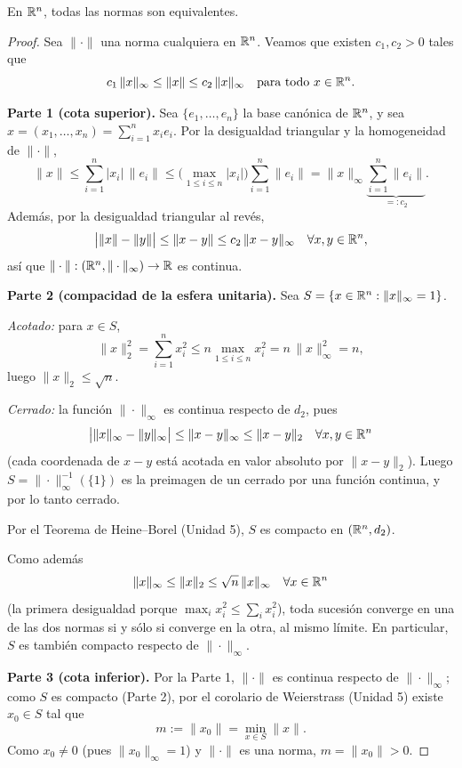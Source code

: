 \begin{teo}
En $\mathbb{R}^n$, todas las normas son equivalentes.
\end{teo}

\begin{proof}
Sea $\|\cdot\|$ una norma cualquiera en $\mathbb{R}^n$. Veamos que existen
$c_1,c_2>0$ tales que
\[
c_1\,\|x\|_\infty \le \|x\| \le c_2\,\|x\|_\infty \quad
\text{para todo } x\in\mathbb{R}^n.
\]

\textbf{Parte 1 (cota superior).} Sea $\{e_1,\dots,e_n\}$ la base
canónica de $\mathbb{R}^n$, y sea $x=(x_1,\dots,x_n)=\sum_{i=1}^n x_i e_i$. Por
la desigualdad triangular y la homogeneidad de $\|\cdot\|$,
\[
\|x\| \le \sum_{i=1}^n |x_i|\,\|e_i\| \le
\Big(\max_{1\le i\le n}|x_i|\Big)\sum_{i=1}^n \|e_i\|
= \|x\|_\infty \underbrace{\sum_{i=1}^n \|e_i\|}_{=:c_2} .
\]
Además, por la desigualdad triangular al revés,
\[
\bigl|\|x\|-\|y\|\bigr| \le \|x-y\| \le c_2\,\|x-y\|_\infty \quad
\forall x,y\in\mathbb{R}^n,
\]
así que $\|\cdot\| : (\mathbb{R}^n,\|\cdot\|_\infty)\to\mathbb{R}$ es continua.

\textbf{Parte 2 (compacidad de la esfera unitaria).} Sea
$S=\{x\in\mathbb{R}^n : \|x\|_\infty=1\}$.

\emph{Acotado:} para $x\in S$,
\[
\|x\|_2^2 = \sum_{i=1}^n x_i^2 \le n \max_{1\le i\le n} x_i^2
= n\,\|x\|_\infty^2 = n,
\]
luego $\|x\|_2 \le \sqrt n$.

\emph{Cerrado:} la función $\|\cdot\|_\infty$ es continua respecto de
$d_2$, pues
\[
\bigl|\|x\|_\infty-\|y\|_\infty\bigr| \le \|x-y\|_\infty \le \|x-y\|_2
\quad \forall x,y\in\mathbb{R}^n
\]
(cada coordenada de $x-y$ está acotada en valor absoluto por
$\|x-y\|_2$). Luego $S=\|\cdot\|_\infty^{-1}(\{1\})$ es la preimagen de
un cerrado por una función continua, y por lo tanto cerrado.

Por el Teorema de Heine--Borel (Unidad 5), $S$ es compacto en
$(\mathbb{R}^n,d_2)$.

Como además
\[
\|x\|_\infty \le \|x\|_2 \le \sqrt n\,\|x\|_\infty \quad
\forall x\in\mathbb{R}^n
\]
(la primera desigualdad porque $\max_i x_i^2 \le \sum_i x_i^2$), toda
sucesión converge en una de las dos normas si y sólo si converge en la
otra, al mismo límite. En particular, $S$ es también compacto respecto
de $\|\cdot\|_\infty$.

\textbf{Parte 3 (cota inferior).} Por la Parte 1, $\|\cdot\|$ es
continua respecto de $\|\cdot\|_\infty$; como $S$ es compacto (Parte
2), por el corolario de Weierstrass (Unidad 5) existe $x_0\in S$ tal
que
\[
m := \|x_0\| = \min_{x\in S} \|x\|.
\]
Como $x_0\ne 0$ (pues $\|x_0\|_\infty=1$) y $\|\cdot\|$ es una norma,
$m=\|x_0\|>0$.


\end{proof}
